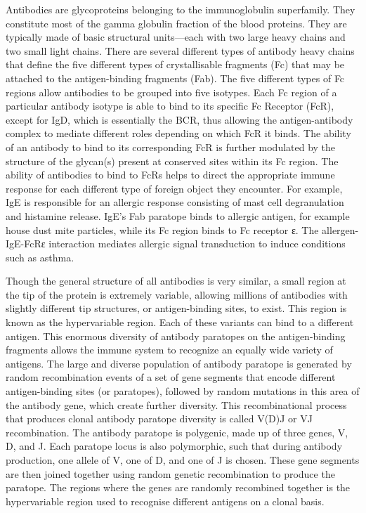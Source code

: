 Antibodies are glycoproteins belonging to the immunoglobulin superfamily. They constitute most of the gamma globulin fraction of the blood proteins. They are typically made of basic structural units---each with two large heavy chains and two small light chains. There are several different types of antibody heavy chains that define the five different types of crystallisable fragments (Fc) that may be attached to the antigen-binding fragments (Fab). The five different types of Fc regions allow antibodies to be grouped into five isotypes. Each Fc region of a particular antibody isotype is able to bind to its specific Fc Receptor (FcR), except for IgD, which is essentially the BCR, thus allowing the antigen-antibody complex to mediate different roles depending on which FcR it binds. The ability of an antibody to bind to its corresponding FcR is further modulated by the structure of the glycan(s) present at conserved sites within its Fc region. The ability of antibodies to bind to FcRs helps to direct the appropriate immune response for each different type of foreign object they encounter. For example, IgE is responsible for an allergic response consisting of mast cell degranulation and histamine release. IgE's Fab paratope binds to allergic antigen, for example house dust mite particles, while its Fc region binds to Fc receptor ε. The allergen-IgE-FcRε interaction mediates allergic signal transduction to induce conditions such as asthma.

Though the general structure of all antibodies is very similar, a small region at the tip of the protein is extremely variable, allowing millions of antibodies with slightly different tip structures, or antigen-binding sites, to exist. This region is known as the hypervariable region. Each of these variants can bind to a different antigen. This enormous diversity of antibody paratopes on the antigen-binding fragments allows the immune system to recognize an equally wide variety of antigens. The large and diverse population of antibody paratope is generated by random recombination events of a set of gene segments that encode different antigen-binding sites (or paratopes), followed by random mutations in this area of the antibody gene, which create further diversity. This recombinational process that produces clonal antibody paratope diversity is called V(D)J or VJ recombination. The antibody paratope is polygenic, made up of three genes, V, D, and J. Each paratope locus is also polymorphic, such that during antibody production, one allele of V, one of D, and one of J is chosen. These gene segments are then joined together using random genetic recombination to produce the paratope. The regions where the genes are randomly recombined together is the hypervariable region used to recognise different antigens on a clonal basis.

